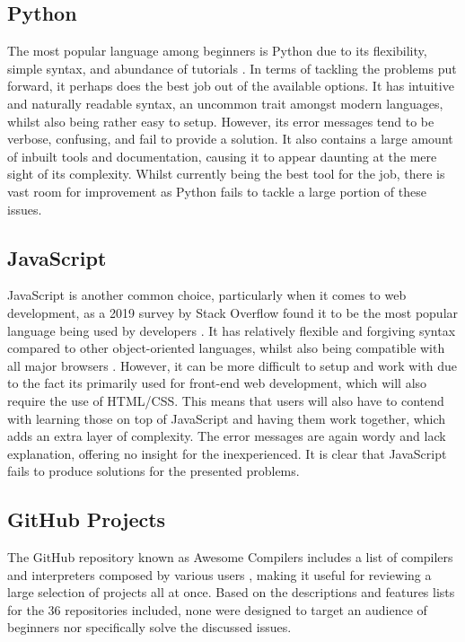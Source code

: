 \documentclass[
]{report}
\begin{document}
\subsection{Python}
The most popular language among beginners is Python due to its
flexibility, simple syntax, and abundance of tutorials \cite{simplilearn-article}. In
terms of tackling the problems put forward, it perhaps does the best job
out of the available options. It has intuitive and naturally readable
syntax, an uncommon trait amongst modern languages, whilst also being
rather easy to setup. However, its error messages tend to be verbose,
confusing, and fail to provide a solution. It also contains a large
amount of inbuilt tools and documentation, causing it to appear daunting
at the mere sight of its complexity. Whilst currently being the best
tool for the job, there is vast room for improvement as Python fails to
tackle a large portion of these issues.

\subsection{JavaScript}
JavaScript is another common choice, particularly when it comes to web
development, as a 2019 survey by Stack Overflow found it to be the most
popular language being used by developers \cite{survey-stackoverflow}. It has relatively
flexible and forgiving syntax compared to other object-oriented
languages, whilst also being compatible with all major browsers
\cite{fullstack-article}. However, it can be more difficult to setup and work with due
to the fact its primarily used for front-end web development, which will
also require the use of HTML/CSS. This means that users will also have
to contend with learning those on top of JavaScript and having them work
together, which adds an extra layer of complexity. The error
messages are again wordy and lack explanation, offering no insight for
the inexperienced. It is clear that JavaScript fails to produce
solutions for the presented problems.

\subsection{GitHub Projects}
The GitHub repository known as Awesome Compilers includes a list of 
compilers and \glspl{interpreter} composed by various users \cite{compilers-github}, 
making it useful for reviewing a large selection of projects all at once. 
Based on the descriptions and features lists for the 36 repositories 
included, none were designed to target an audience of beginners nor 
specifically solve the discussed issues.
\end{document}

